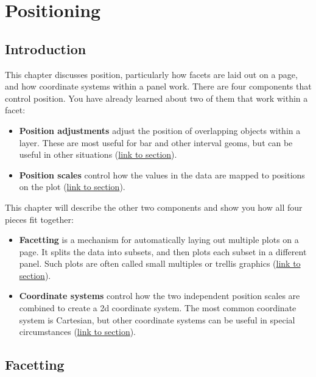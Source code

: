 \chapter{Positioning}\label{cha:position}

\section{Introduction}\label{introduction}

This chapter discusses position, particularly how facets are laid out on
a page, and how coordinate systems within a panel work. There are four
components that control position. You have already learned about two of
them that work within a facet: 

\begin{itemize}
\item
  \textbf{Position adjustments} adjust the position of overlapping
  objects within a layer. These are most useful for bar and other
  interval geoms, but can be useful in other situations
  (\protect\hyperlink{sec:position}{link to section}).
\item
  \textbf{Position scales} control how the values in the data are mapped
  to positions on the plot (\protect\hyperlink{sub:scale-position}{link
  to section}).
\end{itemize}

This chapter will describe the other two components and show you how all
four pieces fit together:

\begin{itemize}
\item
  \textbf{Facetting} is a mechanism for automatically laying out
  multiple plots on a page. It splits the data into subsets, and then
  plots each subset in a different panel. Such plots are often called
  small multiples or trellis graphics
  (\protect\hyperlink{sec:facetting}{link to section}).
\item
  \textbf{Coordinate systems} control how the two independent position
  scales are combined to create a 2d coordinate system. The most common
  coordinate system is Cartesian, but other coordinate systems can be
  useful in special circumstances (\protect\hyperlink{sec:coord}{link to
  section}).
\end{itemize}

\hypertarget{sec:facetting}{\section{Facetting}\label{sec:facetting}}

